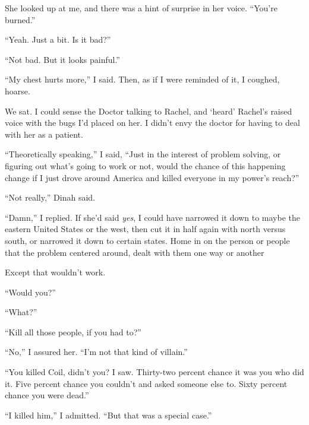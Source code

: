 She looked up at me, and there was a hint of surprise in her voice.  ``You're burned.''



``Yeah.  Just a bit.  Is it bad?''



``Not bad.  But it looks painful.''



``My chest hurts more,'' I said.  Then, as if I were reminded of it, I coughed, hoarse.



We sat.  I could sense the Doctor talking to Rachel, and `heard' Rachel's raised voice with the bugs I'd placed on her.  I didn't envy the doctor for having to deal with her as a patient.



``Theoretically speaking,'' I said, ``Just in the interest of problem solving, or figuring out what's going to work or not, would the chance of this happening change if I just drove around America and killed everyone in my power's reach?''



``Not really,'' Dinah said.



``Damn,'' I replied.  If she'd said \emph{yes}, I could have narrowed it down to maybe the eastern United States or the west, then cut it in half again with north versus south, or narrowed it down to certain states.  Home in on the person or people that the problem centered around, dealt with them one way or another



Except that wouldn't work.



``Would you?''



``What?''



``Kill all those people, if you had to?''



``No,'' I assured her.  ``I'm not that kind of villain.''



``You killed Coil, didn't you?  I saw.  Thirty-two percent chance it was you who did it.  Five percent chance you couldn't and asked someone else to.  Sixty percent chance you were dead.''



``I killed him,'' I admitted.  ``But that was a special case.''



